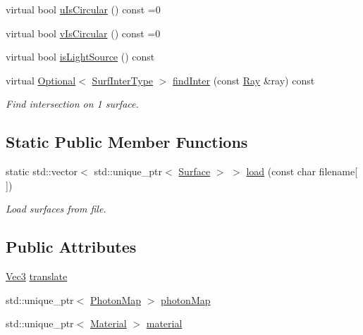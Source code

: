 \begin{DoxyCompactItemize}
virtual bool \hyperlink{classSurface_a11d5759ec3e3d43036fb949dcc6f5562}{u\+Is\+Circular} () const =0
\item 
virtual bool \hyperlink{classSurface_af52f9322929a702a9aaeee3ae4a368da}{v\+Is\+Circular} () const =0
\item 
virtual bool \hyperlink{classSurface_a5968cee515dd97f1e5066fec7cbf9b03}{is\+Light\+Source} () const 
\item 
virtual \hyperlink{classOptional}{Optional}$<$ \hyperlink{structSurfInterType}{Surf\+Inter\+Type} $>$ \hyperlink{classSurface_af7b5584007bf626bf7b37fcf649e6cd6}{find\+Inter} (const \hyperlink{structRay}{Ray} \&ray) const 
\begin{DoxyCompactList}\small\item\em Find intersection on 1 surface. \end{DoxyCompactList}\end{DoxyCompactItemize}
\subsection*{Static Public Member Functions}
\begin{DoxyCompactItemize}
\item 
static std\+::vector$<$ std\+::unique\+\_\+ptr$<$ \hyperlink{classSurface}{Surface} $>$ $>$ \hyperlink{classSurface_a73a61d351a694602ca76ac1ecb3937e9}{load} (const char filename\mbox{[}$\,$\mbox{]})
\begin{DoxyCompactList}\small\item\em Load surfaces from file. \end{DoxyCompactList}\end{DoxyCompactItemize}
\subsection*{Public Attributes}
\begin{DoxyCompactItemize}
\item 
\hyperlink{vec_8h_ae4fcaa7c0a3935930ed1be5f70b90373}{Vec3} \hyperlink{classSurface_a442734b024ed1013878d098d27ade6ad}{translate}
\item 
std\+::unique\+\_\+ptr$<$ \hyperlink{classPhotonMap}{Photon\+Map} $>$ \hyperlink{classSurface_aa624ee597db52c7c8f341e5a31b9e279}{photon\+Map}
\item 
std\+::unique\+\_\+ptr$<$ \hyperlink{structMaterial}{Material} $>$ \hyperlink{classSurface_aa68847b731186c38991568c5925ad862}{material}
\end{DoxyCompactItemize}
